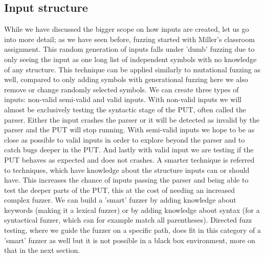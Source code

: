\subsection{Input structure}
\label{fuzzing:InputStructure}
While we have discussed the bigger scope on how inputs are created, let us go into more detail; as we have seen before, fuzzing started with Miller's classroom assignment. This random generation of inputs falls under 'dumb' fuzzing due to only seeing the input as one long list of independent symbols with no knowledge of any structure. This technique can be applied similarly to mutational fuzzing as well, compared to only adding symbols with generational fuzzing here we also remove or change randomly selected symbols. 
We can create three types of inputs: non-valid semi-valid and valid inputs. With non-valid inputs we will almost be exclusively testing the syntactic stage of the PUT, often called the parser. Either the input crashes the parser or it will be detected as invalid by the parser and the PUT will stop running. With semi-valid inputs we hope to be as close as possible to valid inputs in order to explore beyond the parser and to catch bugs deeper in the PUT. And lastly with valid input we are testing if the PUT behaves as expected and does not crashes.
A smarter technique is referred to techniques, which have knowledge about the structure inputs can or should have. This increases the chance of inputs passing the parser and being able to test the deeper parts of the PUT, this at the cost of needing an increased complex fuzzer. We can build a 'smart' fuzzer by adding knowledge about keywords (making it a lexical fuzzer) or by adding knowledge about syntax (for a syntactical fuzzer, which can for example match all parentheses). Directed fuzz testing, where we guide the fuzzer on a specific path, does fit in this category of a 'smart' fuzzer as well but it is not possible in a black box environment, more on that in the next section.

